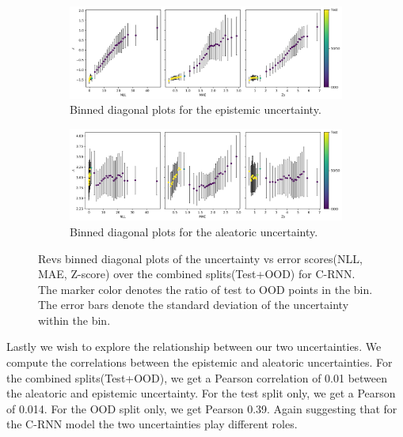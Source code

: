 \begin{figure}[htbp]
  \centering
    \begin{subfigure}[b]{\textwidth}
        \includegraphics[width=\textwidth]{Experiments/figs/binned/revs_crnn_epistemic.png}
        \caption{Binned diagonal plots for the epistemic uncertainty.}
        \label{fig:revs_epistemic_corr}
    \end{subfigure}
    
    \begin{subfigure}[b]{\textwidth}
        \includegraphics[width=\textwidth]{Experiments/figs/binned/revs_crnn_aleatoric.png}
        \caption{Binned diagonal plots for the aleatoric uncertainty.}
    \label{fig:revs_aleatoric_corr}
  \end{subfigure}
    \caption[Revs error-uncertainty diagonal plots for C-RNN]{Revs binned diagonal plots of the  uncertainty vs error scores(NLL, MAE, Z-score) over the combined splits(Test+OOD) for C-RNN. The marker color denotes the ratio of test to OOD points in the bin. The error bars denote the standard deviation of the uncertainty within the bin.}
    \label{fig:revs_uncertainty_corr}
\end{figure}


Lastly we wish to explore the relationship between our two uncertainties. We compute the correlations between the epistemic and aleatoric uncertainties. For the combined splits(Test+OOD), we get a Pearson correlation of 0.01 between the aleatoric and epistemic uncertainty. For the test split only, we get a Pearson of 0.014. For the OOD split only, we get Pearson 0.39. Again suggesting that for the C-RNN model the two uncertainties play different roles. 

